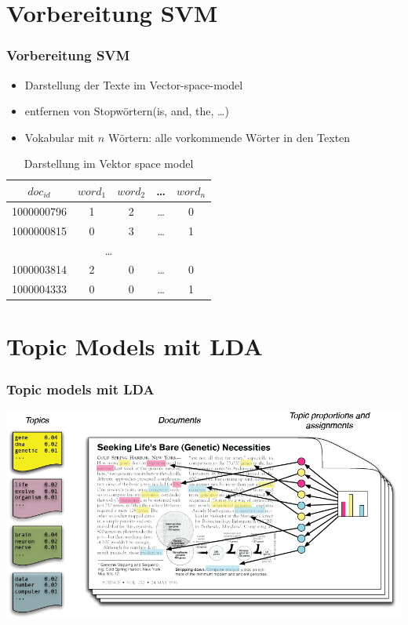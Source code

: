 \documentclass[12pt, xcolor=table]{beamer}
\begin{document}
\section{Vorbereitung SVM}
\begin{frame}
    \frametitle{Vorbereitung SVM}
    \begin{itemize}
        \item Darstellung der Texte im Vector-space-model
        \item entfernen von Stopwörtern(is, and, the, \ldots)
        \item Vokabular mit $n$ Wörtern: alle vorkommende Wörter in den Texten
    \end{itemize}
        \begin{table}
            \begin{tabular}{c|cccc}
                \tiny\textbf{$doc_{id}$} &\tiny \textbf{$word_{1}$} &\tiny \textbf{$word_{2}$} &\tiny \textbf{\dots} & \tiny \textbf{$word_{n}$} \\
                \hline
                \tiny 1000000796 &\tiny 1 & \tiny 2 & \tiny  \dots  & \tiny 0 \\
                \tiny 1000000815 &\tiny 0 & \tiny 3 & \tiny \dots  & \tiny 1 \\
                \multicolumn{5}{c}{\dots} \\
                \tiny 1000003814 &\tiny 2  & \tiny 0 & \tiny  \dots  & \tiny 0 \\
                \tiny 1000004333 & \tiny 0 &\tiny 0 &\tiny  \dots & \tiny 1 \\
            \end{tabular}
             \caption*{Darstellung im Vektor space model}
        \end{table}
\end{frame}
\section{Topic Models mit LDA}
\begin{frame}
    \frametitle{Topic models mit LDA}
    \begin{center}
        \includegraphics[scale=0.35]{figures/IntroToLDA.png}
    \end{center}
\end{frame}
\end{document}
